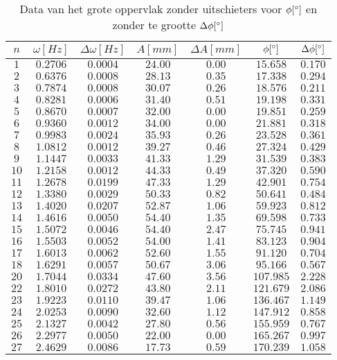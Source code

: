 \documentclass[12pt,a4]{article}
\begin{document}
\begin{table}[h]
\centering
\caption{Data van het grote oppervlak zonder uitschieters voor $\phi [\degree]$ en zonder te grootte $\Delta\phi [\degree]$}
\begin{tabular}{c | c | c | c | c | c | c }
$ n $&$\omega [Hz] $&$ \Delta\omega [Hz] $&$ A [mm] $&$ \Delta A [mm] $&$ \phi [\degree] $&$ \Delta \phi [\degree] $\\
\hline
$ 1 $&$ 0.2706 $&$ 0.0004 $&$ 24.00 $&$ 0.00 $&$ 15.658 $&$ 0.170 $\\
$ 2 $&$ 0.6376 $&$ 0.0008 $&$ 28.13 $&$ 0.35 $&$ 17.338 $&$ 0.294 $\\
$ 3 $&$ 0.7874 $&$ 0.0008 $&$ 30.07 $&$ 0.26 $&$ 18.576 $&$ 0.211 $\\
$ 4 $&$ 0.8281 $&$ 0.0006 $&$ 31.40 $&$ 0.51 $&$ 19.198 $&$ 0.331 $\\
$ 5 $&$ 0.8670 $&$ 0.0007 $&$ 32.00 $&$ 0.00 $&$ 19.851 $&$ 0.259 $\\
$ 6 $&$ 0.9360 $&$ 0.0012 $&$ 34.00 $&$ 0.00 $&$ 21.881 $&$ 0.318 $\\
$ 7 $&$ 0.9983 $&$ 0.0024 $&$ 35.93 $&$ 0.26 $&$ 23.528 $&$ 0.361 $\\
$ 8 $&$ 1.0812 $&$ 0.0012 $&$ 39.27 $&$ 0.46 $&$ 27.324 $&$ 0.429 $\\
$ 9 $&$ 1.1447 $&$ 0.0033 $&$ 41.33 $&$ 1.29 $&$ 31.539 $&$ 0.383 $\\
$ 10 $&$ 1.2158 $&$ 0.0012 $&$ 44.33 $&$ 0.49 $&$ 37.320 $&$ 0.590 $\\
$ 11 $&$ 1.2678 $&$ 0.0199 $&$ 47.33 $&$ 1.29 $&$ 42.901 $&$ 0.754 $\\
$ 12 $&$ 1.3380 $&$ 0.0029 $&$ 50.33 $&$ 0.82 $&$ 50.641 $&$ 0.484 $\\
$ 13 $&$ 1.4020 $&$ 0.0207 $&$ 52.87 $&$ 1.06 $&$ 59.923 $&$ 0.812 $\\
$ 14 $&$ 1.4616 $&$ 0.0050 $&$ 54.40 $&$ 1.35 $&$ 69.598 $&$ 0.733 $\\
$ 15 $&$ 1.5072 $&$ 0.0046 $&$ 54.40 $&$ 2.47 $&$ 75.745 $&$ 0.941 $\\
$ 16 $&$ 1.5503 $&$ 0.0052 $&$ 54.00 $&$ 1.41 $&$ 83.123 $&$ 0.904 $\\
$ 17 $&$ 1.6013 $&$ 0.0062 $&$ 52.60 $&$ 1.55 $&$ 91.120 $&$ 0.704 $\\
$ 18 $&$ 1.6291 $&$ 0.0057 $&$ 50.67 $&$ 3.06 $&$ 95.166 $&$ 0.567 $\\
$ 20 $&$ 1.7044 $&$ 0.0334 $&$ 47.60 $&$ 3.56 $&$ 107.985 $&$ 2.228 $\\
$ 22 $&$ 1.8010 $&$ 0.0272 $&$ 43.80 $&$ 2.11 $&$ 121.679 $&$ 2.086 $\\
$ 23 $&$ 1.9223 $&$ 0.0110 $&$ 39.47 $&$ 1.06 $&$ 136.467 $&$ 1.149 $\\
$ 24 $&$ 2.0253 $&$ 0.0090 $&$ 32.60 $&$ 1.12 $&$ 147.912 $&$ 0.858 $\\
$ 25 $&$ 2.1327 $&$ 0.0042 $&$ 27.80 $&$ 0.56 $&$ 155.959 $&$ 0.767 $\\
$ 26 $&$ 2.2977 $&$ 0.0050 $&$ 22.00 $&$ 0.00 $&$ 165.267 $&$ 0.997 $\\
$ 27 $&$ 2.4629 $&$ 0.0086 $&$ 17.73 $&$ 0.59 $&$ 170.239 $&$ 1.058 $\\
\end{tabular}
\end{table}
\end{document}
